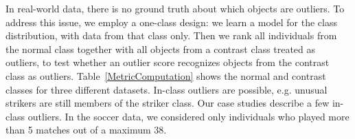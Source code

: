 \documentclass[conference]{IEEEtran}
\begin{document}
					
					In real-world data, there is no ground truth about which objects are outliers. To address this issue, we employ a one-class design: we learn a model for the class distribution, with data from that class only. Then we rank all individuals from the normal class together with all objects from a contrast class treated as outliers, to test whether an outlier score recognizes objects from the contrast class as outliers.
					Table~\ref{MetricComputation} shows the normal and contrast classes for three different datasets.  In-class outliers are possible, e.g. unusual strikers are still members of the striker class. Our case studies describe a few in-class outliers. In the soccer data, we considered only individuals who played more than 5 matches out of a maximum 38. 
%
					
					
\end{document}

